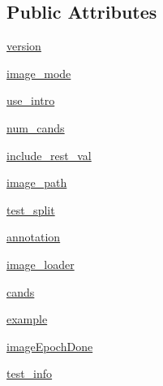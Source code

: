 \subsection*{Public Attributes}
\begin{DoxyCompactItemize}
\item 
\hyperlink{classparlai_1_1tasks_1_1coco__caption_1_1agents_1_1DefaultTeacher_a5945ea0eff083c797fa85d1174c1a2e3}{version}
\item 
\hyperlink{classparlai_1_1tasks_1_1coco__caption_1_1agents_1_1DefaultTeacher_a9b0ff4c5a830f5b5028ae5f9bb53b62c}{image\+\_\+mode}
\item 
\hyperlink{classparlai_1_1tasks_1_1coco__caption_1_1agents_1_1DefaultTeacher_af192ad177d4f90981d27f42fcfcc74d2}{use\+\_\+intro}
\item 
\hyperlink{classparlai_1_1tasks_1_1coco__caption_1_1agents_1_1DefaultTeacher_adced235f1df6c466781732208a03fcc0}{num\+\_\+cands}
\item 
\hyperlink{classparlai_1_1tasks_1_1coco__caption_1_1agents_1_1DefaultTeacher_ae6cae72726e88cd2f64ff60e0bad43fe}{include\+\_\+rest\+\_\+val}
\item 
\hyperlink{classparlai_1_1tasks_1_1coco__caption_1_1agents_1_1DefaultTeacher_afc29d1b2c83ba32ca3fe553c02c873b9}{image\+\_\+path}
\item 
\hyperlink{classparlai_1_1tasks_1_1coco__caption_1_1agents_1_1DefaultTeacher_a20df5fdbe570fb77c5ed9a581e3287ae}{test\+\_\+split}
\item 
\hyperlink{classparlai_1_1tasks_1_1coco__caption_1_1agents_1_1DefaultTeacher_ad9f53dc5f0ebf3ef0fbd6755f060d533}{annotation}
\item 
\hyperlink{classparlai_1_1tasks_1_1coco__caption_1_1agents_1_1DefaultTeacher_a596bf56d444a2182ee157744449e86c2}{image\+\_\+loader}
\item 
\hyperlink{classparlai_1_1tasks_1_1coco__caption_1_1agents_1_1DefaultTeacher_ab3bd0ce49d1e657108577a9777070459}{cands}
\item 
\hyperlink{classparlai_1_1tasks_1_1coco__caption_1_1agents_1_1DefaultTeacher_a05dd82fff16bdd43926056ab15052d98}{example}
\item 
\hyperlink{classparlai_1_1tasks_1_1coco__caption_1_1agents_1_1DefaultTeacher_aa076239254e4754bf6a2753238716f49}{image\+Epoch\+Done}
\item 
\hyperlink{classparlai_1_1tasks_1_1coco__caption_1_1agents_1_1DefaultTeacher_adddb430015e2e7e49376d812acc36fa8}{test\+\_\+info}
\end{DoxyCompactItemize}


